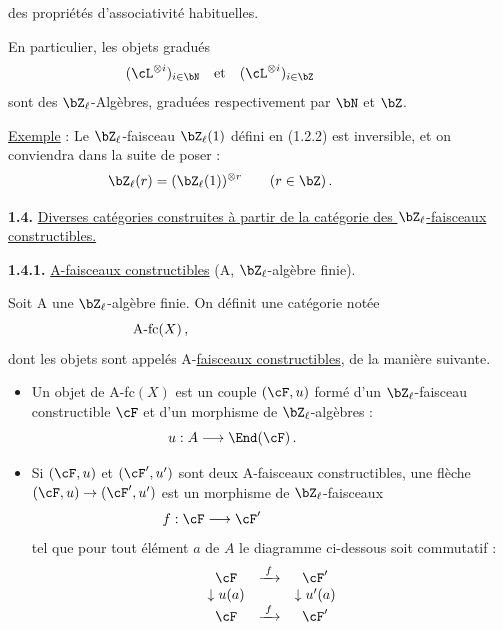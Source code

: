 \newpage

des propri\'et\'es d'associativit\'e habituelles.

En particulier, les objets gradu\'es
\[
(\cL^{\otimes i})_{i \in \bN} \quad \text{et} \quad (\cL^{\otimes i})_{i \in \bZ}\hspace*{2cm}
\]
sont des $\bZ_{\ell}$-Alg\`ebres, gradu\'ees respectivement par $\bN$ et $\bZ$.

\smallskip

\noindent
\underline{Exemple} : Le $\bZ_{\ell}$-faisceau $\bZ_{\ell}(1)$ d\'efini en (1.2.2) est inversible, et on conviendra dans la suite de poser :
\[
\bZ_{\ell}(r) = (\bZ_{\ell}(1))^{\otimes r} \qquad (r \in \bZ)\,.\hspace*{2cm}
\]

\bigskip

\noindent
\textbf{1.4.} \underline{Diverses cat\'egories construites \`a partir de la cat\'egorie des $\bZ_{\ell}$-faisceaux constructibles.}

\noindent
\textbf{1.4.1.} \underline{A-faisceaux constructibles} (A, $\bZ_{\ell}$-alg\`ebre finie).

Soit A une $\bZ_{\ell}$-alg\`ebre finie. On d\'efinit une cat\'egorie not\'ee
\[
\text{A-fc}(X)\,,\hspace*{5cm}
\]
dont les objets sont appel\'es A-\underline{faisceaux constructibles}, de la mani\`ere suivante.
\begin{itemize}
\item[(i)] Un objet de A-fc$(X)$ est un couple $(\cF, u)$ form\'e d'un $\bZ_{\ell}$-faisceau constructible $\cF$ et d'un morphisme de $\bZ_{\ell}$-alg\`ebres :
\[
u : A \longrightarrow \End(\cF)\,.\hspace*{2cm}
\]
\item[(ii)] Si $(\cF, u)$ et $(\cF', u')$ sont deux A-faisceaux constructibles, une fl\`eche $(\cF, u) \rightarrow (\cF', u')$ est un morphisme de $\bZ_{\ell}$-faisceaux
\[
f : \cF \longrightarrow \cF'\hspace*{3cm}
\]
tel que pour tout \'el\'ement $a$ de $A$ le diagramme ci-dessous soit commutatif :
\[
\begin{array}{ccc}
\cF & \xrightarrow{\;f\;} & \cF' \\
\downarrow{u(a)} & & \downarrow{u'(a)} \\
\cF & \xrightarrow{\;f\;} & \cF'
\end{array}
\]
\end{itemize}

\smallskip

